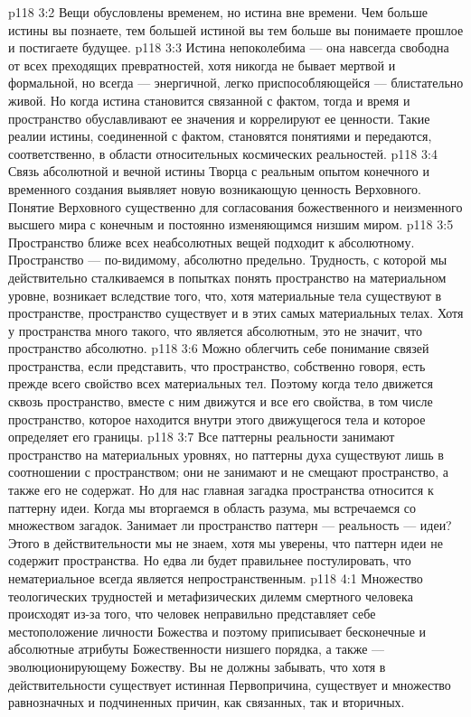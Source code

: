 \vs p118 3:2 \pc Вещи обусловлены временем, но истина вне времени. Чем больше истины вы познаете, тем большей истиной вы  тем больше вы понимаете прошлое и постигаете будущее.
\vs p118 3:3 Истина непоколебима --- она навсегда свободна от всех преходящих превратностей, хотя никогда не бывает мертвой и формальной, но всегда --- энергичной, легко приспособляющейся --- блистательно живой. Но когда истина становится связанной с фактом, тогда и время и пространство обуславливают ее значения и коррелируют ее ценности. Такие реалии истины, соединенной с фактом, становятся понятиями и передаются, соответственно, в области относительных космических реальностей.
\vs p118 3:4 Связь абсолютной и вечной истины Творца с реальным опытом конечного и временного создания выявляет новую возникающую ценность Верховного. Понятие Верховного существенно для согласования божественного и неизменного высшего мира с конечным и постоянно изменяющимся низшим миром.
\vs p118 3:5 \pc Пространство ближе всех неабсолютных вещей подходит к абсолютному. Пространство --- по\hyp{}видимому, абсолютно предельно. Трудность, с которой мы действительно сталкиваемся в попытках понять пространство на материальном уровне, возникает вследствие того, что, хотя материальные тела существуют в пространстве, пространство существует и в этих самых материальных телах. Хотя у пространства много такого, что является абсолютным, это не значит, что пространство абсолютно.
\vs p118 3:6 Можно облегчить себе понимание связей пространства, если представить, что пространство, собственно говоря, есть прежде всего свойство всех материальных тел. Поэтому когда тело движется сквозь пространство, вместе с ним движутся и все его свойства, в том числе пространство, которое находится внутри этого движущегося тела и которое определяет его границы.
\vs p118 3:7 Все паттерны реальности занимают пространство на материальных уровнях, но паттерны духа существуют лишь в соотношении с пространством; они не занимают и не смещают пространство, а также его не содержат. Но для нас главная загадка пространства относится к паттерну идеи. Когда мы вторгаемся в область разума, мы встречаемся со множеством загадок. Занимает ли пространство паттерн --- реальность --- идеи? Этого в действительности мы не знаем, хотя мы уверены, что паттерн идеи не содержит пространства. Но едва ли будет правильнее постулировать, что нематериальное всегда является непространственным.
\vs p118 4:1 Множество теологических трудностей и метафизических дилемм смертного человека происходят из\hyp{}за того, что человек неправильно представляет себе местоположение личности Божества и поэтому приписывает бесконечные и абсолютные атрибуты Божественности низшего порядка, а также --- эволюционирующему Божеству. Вы не должны забывать, что хотя в действительности существует истинная Первопричина, существует и множество равнозначных и подчиненных причин, как связанных, так и вторичных.
